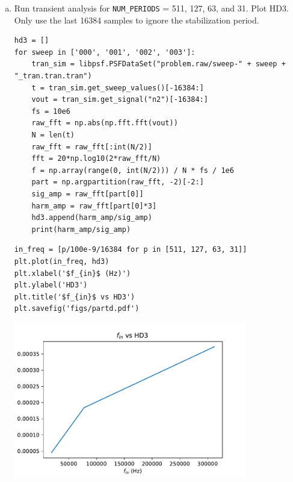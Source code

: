 \documentclass[11pt]{article}
\begin{document}
\begin{enumerate}[a)]
  \item Run transient analysis for \texttt{NUM\_PERIODS} = 511, 127, 63, and 31. Plot HD3. Only use the last 16384 samples to ignore the stabilization period.

  \begin{verbatim}
hd3 = []
for sweep in ['000', '001', '002', '003']:
    tran_sim = libpsf.PSFDataSet("problem.raw/sweep-" + sweep + "_tran.tran.tran")
    t = tran_sim.get_sweep_values()[-16384:]
    vout = tran_sim.get_signal("n2")[-16384:]
    fs = 10e6
    raw_fft = np.abs(np.fft.fft(vout))
    N = len(t)
    raw_fft = raw_fft[:int(N/2)]
    fft = 20*np.log10(2*raw_fft/N)
    f = np.array(range(0, int(N/2))) / N * fs / 1e6
    part = np.argpartition(raw_fft, -2)[-2:]
    sig_amp = raw_fft[part[0]]
    harm_amp = raw_fft[part[0]*3]
    hd3.append(harm_amp/sig_amp)
    print(harm_amp/sig_amp)
  \end{verbatim}

  \begin{verbatim}
in_freq = [p/100e-9/16384 for p in [511, 127, 63, 31]]
plt.plot(in_freq, hd3)
plt.xlabel('$f_{in}$ (Hz)')
plt.ylabel('HD3')
plt.title('$f_{in}$ vs HD3')
plt.savefig('figs/partd.pdf')
  \end{verbatim}

  \begin{center}
    \includegraphics[width=0.8\textwidth]{figs/partd.pdf}
  \end{center}
\end{enumerate}
\end{document}
